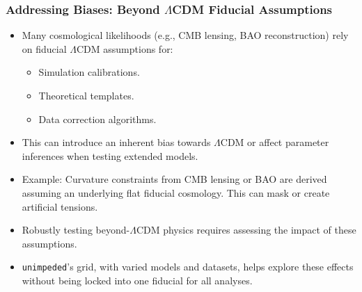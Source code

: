 \documentclass[aspectratio=169]{beamer}
\begin{document}
\begin{frame}
    \frametitle{Addressing Biases: Beyond $\Lambda$CDM Fiducial Assumptions}
        \begin{itemize}
            \item Many cosmological likelihoods (e.g., CMB lensing, BAO reconstruction) rely on fiducial $\Lambda$CDM assumptions for:
                \begin{itemize}
                    \item Simulation calibrations.
                    \item Theoretical templates.
                    \item Data correction algorithms.
                \end{itemize}
            \item This can introduce an inherent bias towards $\Lambda$CDM or affect parameter inferences when testing extended models.
            \item Example: Curvature constraints from CMB lensing or BAO are derived assuming an underlying flat fiducial cosmology. This can mask or create artificial tensions.
            \item Robustly testing beyond-$\Lambda$CDM physics requires assessing the impact of these assumptions.
            \item \texttt{unimpeded}'s grid, with varied models and datasets, helps explore these effects without being locked into one fiducial for all analyses.
        \end{itemize}
\end{frame}
\end{document}
